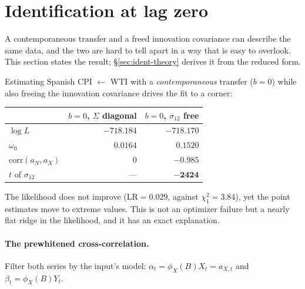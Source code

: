 \documentclass[11pt,a4paper]{article}
\theoremstyle{plain}
\theoremstyle{remark}
\begin{document}
\section{Identification at lag zero}
\label{sec:identification}

A contemporaneous transfer and a freed innovation covariance can describe the same
data, and the two are hard to tell apart in a way that is easy to overlook. This
section states the result; \S\ref{sec:ident-theory} derives it from the reduced
form.

Estimating Spanish CPI $\leftarrow$ WTI with a \emph{contemporaneous} transfer
($b=0$) while also freeing the innovation covariance drives the fit to a corner:

\begin{center}
\begin{tabular}{lrr}
\toprule
 & $b=0$, $\Sigma$ diagonal & $b=0$, $\sigma_{12}$ free \\
\midrule
$\log L$                  & $-718.184$ & $-718.170$ \\
$\omega_0$                & $0.0164$   & $\mathbf{0.1520}$ \\
$\mathrm{corr}(a_N,a_X)$  & $0$        & $\mathbf{-0.985}$ \\
$t$ of $\sigma_{12}$      & ---        & $\mathbf{-2424}$ \\
\bottomrule
\end{tabular}
\end{center}

The likelihood does not improve ($\mathrm{LR}=0.029$, against $\chi^2_1 = 3.84$),
yet the point estimates move to extreme values. This is not an optimizer failure
but a nearly flat ridge in the likelihood, and it has an exact explanation.

\paragraph{The prewhitened cross-correlation.} Filter both series by the input's
model: $\alpha_t = \phi_X(B) X_t = a_{X,t}$ and $\beta_t = \phi_X(B) Y_t$.
\end{document}
